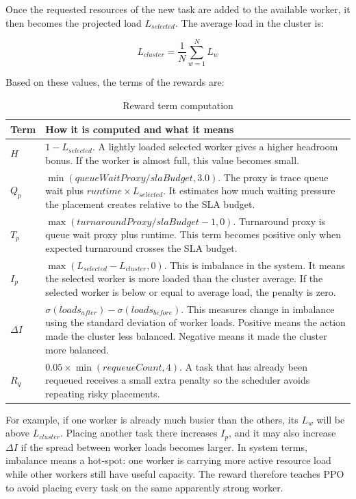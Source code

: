 Once the requested resources of the new task are added to the available worker, it then becomes the projected load \(L_{selected}\). The average load in the cluster is:

\[
L_{cluster} = \frac{1}{N}\sum_{w=1}^{N} L_w
\]

Based on these values, the terms of the rewards are:

\begin{table}[H]
\centering
\caption{Reward term computation}
\label{tab:reward_terms}
\begin{tabularx}{\textwidth}{lX}
\toprule
\textbf{Term} & \textbf{How it is computed and what it means} \\
\midrule
\(H\) & \(1 - L_{selected}\). A lightly loaded selected worker gives a higher headroom bonus. If the worker is almost full, this value becomes small. \\
\(Q_p\) & \(\min(queueWaitProxy / slaBudget, 3.0)\). The proxy is trace queue wait plus \(runtime \times L_{selected}\). It estimates how much waiting pressure the placement creates relative to the SLA budget. \\
\(T_p\) & \(\max(turnaroundProxy / slaBudget - 1, 0)\). Turnaround proxy is queue wait proxy plus runtime. This term becomes positive only when expected turnaround crosses the SLA budget. \\
\(I_p\) & \(\max(L_{selected} - L_{cluster}, 0)\). This is imbalance in the system. It means the selected worker is more loaded than the cluster average. If the selected worker is below or equal to average load, the penalty is zero. \\
\(\Delta I\) & \(\sigma(loads_{after}) - \sigma(loads_{before})\). This measures change in imbalance using the standard deviation of worker loads. Positive means the action made the cluster less balanced. Negative means it made the cluster more balanced. \\
\(R_q\) & \(0.05 \times \min(requeueCount, 4)\). A task that has already been requeued receives a small extra penalty so the scheduler avoids repeating risky placements. \\
\bottomrule
\end{tabularx}
\end{table}

For example, if one worker is already much busier than the others, its \(L_w\) will be above \(L_{cluster}\). Placing another task there increases \(I_p\), and it may also increase \(\Delta I\) if the spread between worker loads becomes larger. In system terms, imbalance means a hot-spot: one worker is carrying more active resource load while other workers still have useful capacity. The reward therefore teaches PPO to avoid placing every task on the same apparently strong worker.

